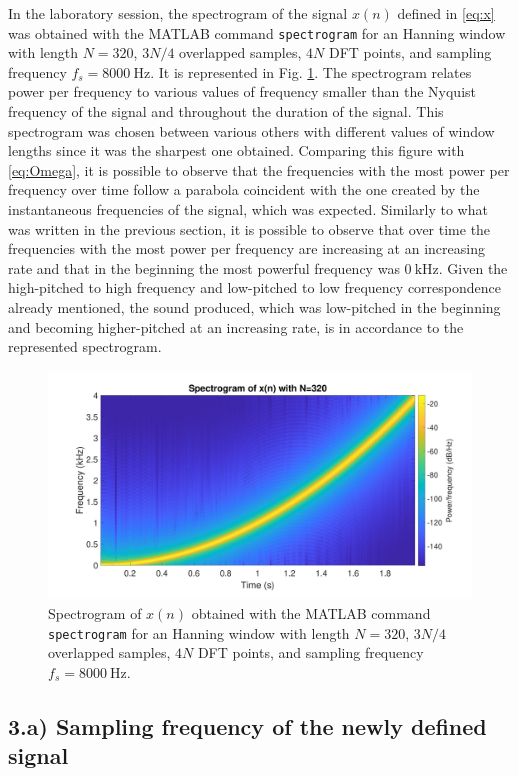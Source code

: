 \documentclass[a4paper, oneside, 11pt]{article}
\begin{document}
In the laboratory session, the spectrogram of the signal $x(n)$ defined in \eqref{eq:x} was obtained with the MATLAB{\texttrademark} command \texttt{spectrogram} for an Hanning window with length $N = 320$, $3N/4$ overlapped samples, $4 N$ DFT points, and sampling frequency $f_s = \SI{8000}{\hertz}$. It is represented in Fig. \ref{fig:spectrogram_x}. The spectrogram relates power per frequency to various values of frequency smaller than the Nyquist frequency of the signal and throughout the duration of the signal. This spectrogram was chosen between various others with different values of window lengths since it was the sharpest one obtained. Comparing this figure with \eqref{eq:Omega}, it is possible to observe that the frequencies with the most power per frequency over time follow a parabola coincident with the one created by the instantaneous frequencies of the signal, which was expected. Similarly to what was written in the previous section, it is possible to observe that over time the frequencies with the most power per frequency are increasing at an increasing rate and that in the beginning the most powerful frequency was $\SI{0}{\kilo \hertz}$. Given the high-pitched to high frequency and low-pitched to low frequency correspondence already mentioned, the sound produced, which was low-pitched in the beginning and becoming higher-pitched at an increasing rate, is in accordance to the represented spectrogram.

\begin{figure}[h!]
    \centering
    \includegraphics[width = 0.8 \textwidth]{figures/spectrogram_x.pdf}
    \caption{Spectrogram of $x(n)$ obtained with the MATLAB{\texttrademark} command \texttt{spectrogram} for an Hanning window with length $N = 320$, $3N/4$ overlapped samples, $4 N$ DFT points, and sampling frequency $f_s = \SI{8000}{\hertz}$.}
    \label{fig:spectrogram_x}
\end{figure}

\subsection{3.a) Sampling frequency of the newly defined signal}
\end{document}
